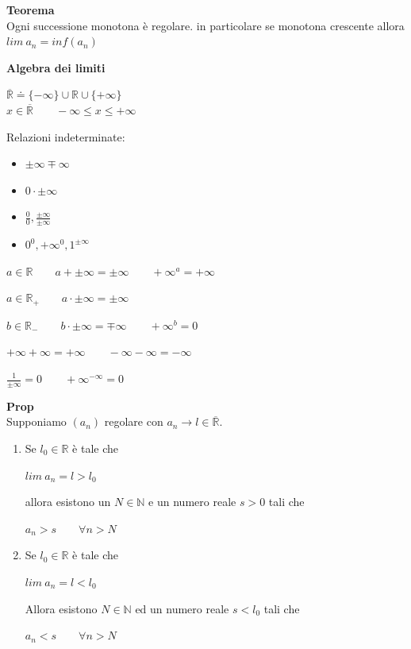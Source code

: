 \documentclass[12pt, a4paper]{article}
\begin{document}
    \textbf{Teorema}\\Ogni successione monotona è regolare. in particolare se monotona crescente allora
$lim\ a_{n}=inf(a_{n})$

    \textbf{Algebra dei limiti}
    \begin{center}
        $\overline{\mathbb{R}}\doteq\{-\infty\}\cup\mathbb{R}\cup\{+\infty\}$\\
        $x\in\overline{\mathbb{R}}\qquad -\infty\leq x\leq +\infty$
    \end{center}
    Relazioni indeterminate:
    \begin{itemize}
        \item $\pm\infty\mp\infty$
        \item $0\cdot\pm\infty$
        \item $\frac{0}{0},\frac{\pm\infty}{\pm\infty}$
        \item $0^{0}, +\infty^{0},1^{\pm\infty}$
    \end{itemize}
    \begin{center}
        $a\in\mathbb{R}\qquad  a+\pm\infty=\pm\infty\qquad  +\infty^{a}=+\infty$

        $a\in\mathbb{R_{+}}\qquad a\cdot\pm\infty=\pm\infty$

        $b\in\mathbb{R_{-}}\qquad b\cdot\pm\infty=\mp\infty\qquad +\infty^{b}=0$

        $+\infty+\infty=+\infty\qquad-\infty-\infty=-\infty$

        $\frac{1}{\pm\infty}=0\qquad+\infty^{-\infty}=0$
    \end{center}

    \textbf{Prop}\\Supponiamo $(a_{n})$ regolare con $a_{n}\to l\in\overline{\mathbb{R}}$.
    \begin{enumerate}
        \item Se $l_{0}\in\mathbb{R}$ è tale che
              \begin{center}
                  $lim\ a_{n}=l>l_{0}$
              \end{center} allora esistono un $N\in\mathbb{N}$ e un numero
              reale $s>0$ tali che
              \begin{center}
                  $a_{n}>s\qquad\forall n>N$
              \end{center}
        \item Se $l_{0}\in\mathbb{R}$ è tale che
              \begin{center}
                  $lim\ a_{n}=l<l_{0}$
              \end{center}
              Allora esistono $N\in\mathbb{N}$ ed un numero reale $s<l_{0}$ tali che
              \begin{center}
                  $a_{n}<s\qquad\forall n>N$
              \end{center}
    \end{enumerate}
\end{document}
